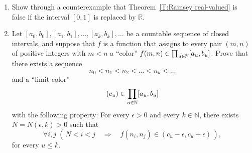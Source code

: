 \begin{exercises}\hfill
\begin{enumerate}
\item
Show through a counterexample that Theorem~\ref{T:Ramsey real-valued} is false if the interval $[0,1]$ is replaced by $\mathbb{R}$.
\item
Let $[a_0,b_0], [a_1, b_1], \dots, [a_k, b_k],\dots$ be a countable sequence of closed intervals, and 
suppose that $f$ is a function that assigns to every pair $(m,n)$ of positive integers with $m<n$ a ``color'' $f(m,n)\in \prod_{u\in\mathbb{N}} [a_u,b_u]$. Prove that there exists a sequence 
\[
n_0 < n_1 < n_2<\dots < n_k<\dots
\]
and a ``limit color''
\[
(c_u) \in \prod_{u\in\mathbb{N}} [a_u,b_u]
\]
with the following property: 
For every $\epsilon>0$ and every $k\in\mathbb{N}$, there exists $N=N(\epsilon,k)>0$ such that
\[
\forall i,j \; (\,N<i<j 
\quad \Longrightarrow\quad
f(n_i, n_j)\in(c_u-\epsilon,c_u+\epsilon)\,),
\]
for every $u\le k$.
\end{enumerate}
\end{exercises}

